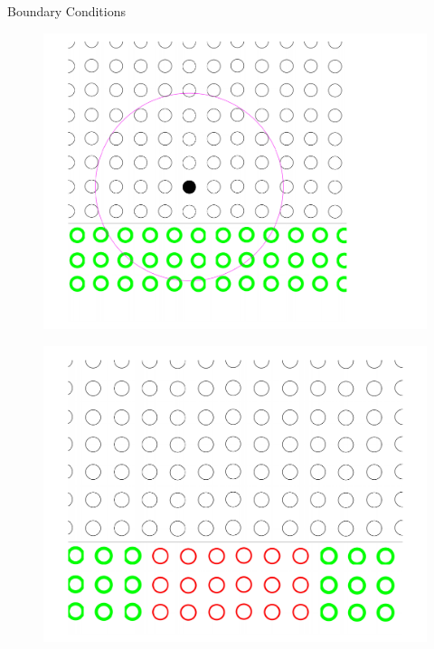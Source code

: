 \documentclass{beamer}
\begin{document}
\begin{frame}{Boundary Conditions}
\begin{minipage}{0.325 \textwidth}
\begin{figure}
\includegraphics[width=0.99 \textwidth]{./PPT/BC_wall2}
\end{figure}
\end{minipage}
\begin{minipage}{0.325 \textwidth}
\begin{figure}
\includegraphics[width=0.95 \textwidth]{./PPT/BC_erupt}
\end{figure}
\end{minipage}
\begin{minipage}{0.325\textwidth}
\begin{figure}

\end{figure}
\end{minipage}
\end{frame}
\end{document}
